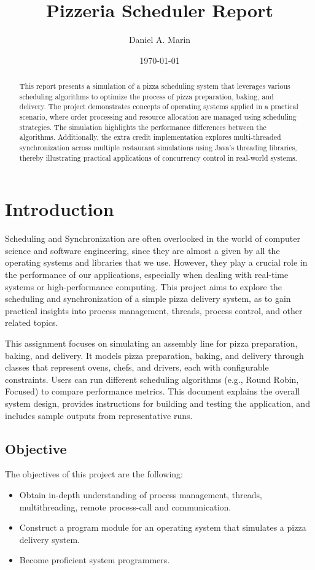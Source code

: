 \documentclass[conference]{IEEEtran}
\begin{document}
\title{Pizzeria Scheduler Report}
\author{Daniel A. Marin}
\date{\today}

\maketitle

\begin{abstract}
    This report presents a simulation of a pizza scheduling system that leverages various scheduling algorithms to optimize the process of pizza preparation, baking, and delivery. The project demonstrates concepts of operating systems applied in a practical scenario, where order processing and resource allocation are managed using scheduling strategies. The simulation highlights the performance differences between the algorithms. Additionally, the extra credit implementation explores multi-threaded synchronization across multiple restaurant simulations using Java's threading libraries, thereby illustrating practical applications of concurrency control in real-world systems.
\end{abstract}

\section{Introduction}
Scheduling and Synchronization are often overlooked in the world of computer science and software engineering, since they are almost a given by all the operating systems and libraries that we use. However, they play a crucial role in the performance of our applications, especially when dealing with real-time systems or high-performance computing. This project aims to explore the scheduling and synchronization of a simple pizza delivery system, as to gain practical insights into process management, threads, process control, and other related topics. 

This assignment focuses on simulating an assembly line for pizza preparation, baking, and delivery. It models pizza preparation, baking, and delivery through classes that represent ovens, chefs, and drivers, each with configurable constraints. Users can run different scheduling algorithms (e.g., Round Robin, Focused) to compare performance metrics. This document explains the overall system design, provides instructions for building and testing the application, and includes sample outputs from representative runs.

\subsection{Objective}
The objectives of this project are the following:
\begin{itemize}
    \item Obtain in-depth understanding of process management, threads, multithreading, remote process-call and communication.
    \item Construct a program module for an operating system that simulates a pizza delivery system.
    \item Become proficient system programmers.
\end{itemize}
\end{document}
